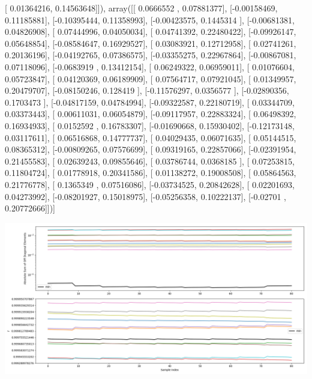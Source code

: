 \documentclass{article}
\begin{document}
       [ 0.01364216,  0.14563648]]), array([[ 0.0666552 ,  0.07881377],
       [-0.00158469,  0.11185881],
       [-0.10395444,  0.11358993],
       [-0.00423575,  0.1445314 ],
       [-0.00681381,  0.04826908],
       [ 0.07444996,  0.04050034],
       [ 0.04741392,  0.22480422],
       [-0.09926147,  0.05648854],
       [-0.08584647,  0.16929527],
       [ 0.03083921,  0.12712958],
       [ 0.02741261,  0.20136196],
       [-0.04192765,  0.07386575],
       [-0.03355275,  0.22967864],
       [-0.00867081,  0.07118096],
       [-0.0683919 ,  0.13412154],
       [ 0.06249322,  0.06959011],
       [ 0.01076604,  0.05723847],
       [ 0.04120369,  0.06189909],
       [ 0.07564717,  0.07921045],
       [ 0.01349957,  0.20479707],
       [-0.08150246,  0.128419  ],
       [-0.11576297,  0.0356577 ],
       [-0.02890356,  0.1703473 ],
       [-0.04817159,  0.04784994],
       [-0.09322587,  0.22180719],
       [ 0.03344709,  0.03373443],
       [ 0.00611031,  0.06054879],
       [-0.09117957,  0.22883324],
       [ 0.06498392,  0.16934933],
       [ 0.0152592 ,  0.16783307],
       [-0.01690668,  0.15930402],
       [-0.12173148,  0.03117611],
       [ 0.06516868,  0.14777737],
       [ 0.04029435,  0.06071635],
       [ 0.05144515,  0.08365312],
       [-0.00809265,  0.07576699],
       [ 0.09319165,  0.22857066],
       [-0.02391954,  0.21455583],
       [ 0.02639243,  0.09855646],
       [ 0.03786744,  0.0368185 ],
       [ 0.07253815,  0.11804724],
       [ 0.01778918,  0.20341586],
       [ 0.01138272,  0.19008508],
       [ 0.05864563,  0.21776778],
       [ 0.1365349 ,  0.07516086],
       [-0.03734525,  0.20842628],
       [ 0.02201693,  0.04273992],
       [-0.08201927,  0.15018975],
       [-0.05256358,  0.10222137],
       [-0.02701   ,  0.20772666]])]
\begin{center}
\includegraphics[scale=.9]{report_pickled_controls168/control_dpn_all.png}

\end{center}
\end{document}
